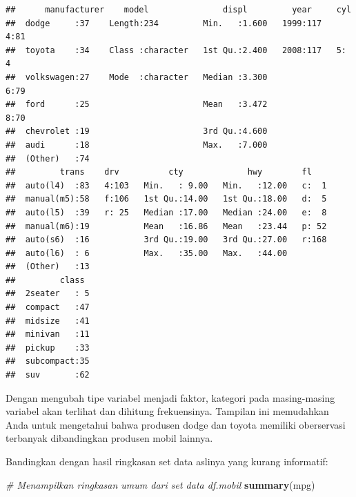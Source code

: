 \documentclass[openany]{book}
\newenvironment{Shaded}{\begin{snugshade}}{\end{snugshade}}
\newcommand{\KeywordTok}[1]{\textcolor[rgb]{0.13,0.29,0.53}{\textbf{#1}}}
\newcommand{\CommentTok}[1]{\textcolor[rgb]{0.56,0.35,0.01}{\textit{#1}}}
\newcommand{\NormalTok}[1]{#1}
\begin{document}
\begin{verbatim}
##      manufacturer    model               displ         year     cyl   
##  dodge     :37    Length:234         Min.   :1.600   1999:117   4:81  
##  toyota    :34    Class :character   1st Qu.:2.400   2008:117   5: 4  
##  volkswagen:27    Mode  :character   Median :3.300              6:79  
##  ford      :25                       Mean   :3.472              8:70  
##  chevrolet :19                       3rd Qu.:4.600                    
##  audi      :18                       Max.   :7.000                    
##  (Other)   :74                                                        
##         trans    drv          cty             hwy        fl     
##  auto(l4)  :83   4:103   Min.   : 9.00   Min.   :12.00   c:  1  
##  manual(m5):58   f:106   1st Qu.:14.00   1st Qu.:18.00   d:  5  
##  auto(l5)  :39   r: 25   Median :17.00   Median :24.00   e:  8  
##  manual(m6):19           Mean   :16.86   Mean   :23.44   p: 52  
##  auto(s6)  :16           3rd Qu.:19.00   3rd Qu.:27.00   r:168  
##  auto(l6)  : 6           Max.   :35.00   Max.   :44.00          
##  (Other)   :13                                                  
##         class   
##  2seater   : 5  
##  compact   :47  
##  midsize   :41  
##  minivan   :11  
##  pickup    :33  
##  subcompact:35  
##  suv       :62
\end{verbatim}

Dengan mengubah tipe variabel menjadi faktor, kategori pada
masing-masing variabel akan terlihat dan dihitung frekuensinya. Tampilan
ini memudahkan Anda untuk mengetahui bahwa produsen dodge dan toyota
memiliki oberservasi terbanyak dibandingkan produsen mobil lainnya.

Bandingkan dengan hasil ringkasan set data aslinya yang kurang
informatif:

\begin{Shaded}
\begin{Highlighting}[]
\CommentTok{# Menampilkan ringkasan umum dari set data df.mobil}
\KeywordTok{summary}\NormalTok{(mpg)}
\end{Highlighting}
\end{Shaded}
\end{document}
